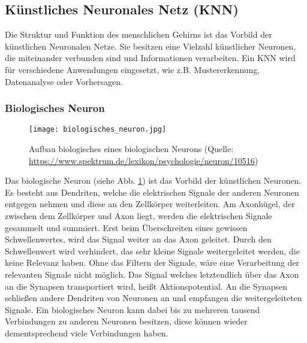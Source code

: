 \subsection{Künstliches Neuronales Netz (\acs{KNN})}
Die Struktur und Funktion des menschlichen Gehirns ist das Vorbild der künstlichen Neuronalen Netze. Sie besitzen eine Vielzahl künstlicher Neuronen, die miteinander verbunden sind und Informationen verarbeiten. Ein \ac{KNN} wird für verschiedene Anwendungen eingesetzt, wie z.B. Mustererkennung, Datenanalyse oder Vorhersagen.

\subsubsection{Biologisches Neuron}

\begin{figure}[h]
	\centering
	\texttt{[image: biologisches\_neuron.jpg]}
	\caption{Aufbau biologisches eines biologischen Neurons (Quelle: \url{https://www.spektrum.de/lexikon/psychologie/neuron/10516})}		\label{fig:BioNeuron}
\end{figure}

Das biologische Neuron (siehe Abb. \ref{fig:BioNeuron}) ist das Vorbild der künstlichen Neuronen. Es besteht aus Dendriten, welche die elektrischen Signale der anderen Neuronen entgegen nehmen und diese an den Zellkörper weiterleiten. 
Am Axonhügel, der zwischen dem Zellkörper und Axon liegt, werden die elektrischen Signale gesammelt und summiert. Erst beim Überschreiten eines gewissen Schwellenwertes, wird das Signal weiter an das Axon geleitet. Durch den Schwellenwert wird verhindert, das sehr kleine Signale weitergeleitet werden, die keine Relevanz haben. Ohne das Filtern der Signale, wäre eine Verarbeitung der relevanten Signale nicht möglich. Das Signal welches letztendlich über das Axon an die Synapsen transportiert wird, heißt Aktionspotential. An die Synapsen schließen andere Dendriten von Neuronen an und empfangen die weitergeleiteten Signale. Ein biologisches Neuron kann dabei bis zu mehreren tausend Verbindungen zu anderen Neuronen besitzen, diese können wieder dementsprechend viele Verbindungen haben.\cite[vgl.][]{Posthoff2022,JuergenCleve2020}

